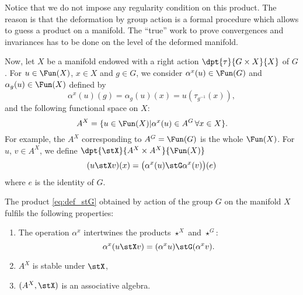 Notice that we do not impose any regularity condition on this product. The reason is that the deformation by group action is a formal procedure which allows to guess a product on a manifold. The ``true'' work to prove convergences and invariances has to be done on the level of the deformed manifold.

Now, let $X$ be a manifold endowed with a right action  $\dpt{\tau}{G\times X}{X}$ of $G$.  For $u\in\Fun(X)$, $x\in X$ and $g\in G$, we consider $\alpha^x(u)\in\Fun(G)$ and $\alpha_g(u)\in\Fun(X)$ defined by
\begin{equation}        \label{EqDefalphaxu}
   \alpha^x(u)(g)=\alpha_g(u)(x)=u(\tau_{g^{-1}}(x)),
\end{equation}
and the following functional space on $X$:
\[
   A^X=\{u\in\Fun(X)|\alpha^x(u)\in A^G\,\forall x\in X\}.
\]
For example, the $A^X$ corresponding to $A^G=\Fun(G)$ is the whole $\Fun(X)$.  For $u$, $v\in A^X$, we define $\dpt{\stX}{A^X\times A^X}{\Fun(X)}$
\begin{equation}\label{eq:def_stG}
   (u\stX v)(x)=\big(\alpha^x(u)\stG \alpha^x(v)\big)(e)
\end{equation}
where $e$ is the identity of $G$.


\begin{theorem}
The product \eqref{eq:def_stG} obtained by action of the group $G$ on the manifold $X$ fulfils the following properties:
\begin{enumerate}
\item\label{itemthostG} The operation $\alpha^x$ intertwines the products $\star^X$ and $\star^G$:
\[
   \alpha^x(u\stX v)=(\alpha^xu)\stG(\alpha^xv).
\]

\item $A^X$ is stable under $\stX$,
\item $(A^X,\stX)$ is an associative algebra.
\end{enumerate}
\end{theorem}


